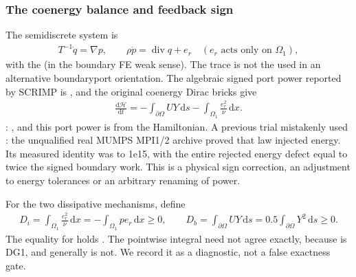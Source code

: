 \documentclass[letterpaper,10pt,english]{sphinxmanual}
\begin{document}
\subsubsection{The co\sphinxhyphen{}energy balance and feedback sign}
\label{\detokenize{examples/wave_coenergy:the-co-energy-balance-and-feedback-sign}}
\sphinxAtStartPar
The semidiscrete system is
\begin{equation*}
\begin{split}T^{-1}\dot q=\nabla p,\qquad
\rho\dot p=\operatorname{div}q+e_r
\quad (e_r\text{ acts only on }\Omega_1),\end{split}
\end{equation*}
\sphinxAtStartPar
with the 
 (in the boundary FE weak sense). The trace is
not the  used in an alternative boundary\sphinxhyphen{}port
orientation. The algebraic signed port power reported
by SCRIMP is , and the original
co\sphinxhyphen{}energy Dirac bricks give
\begin{equation*}
\begin{split}\frac{\mathrm d\mathcal H}{\mathrm dt}
=-\int_{\partial\Omega} UY\,\mathrm ds
 -\int_{\Omega_1}\frac{e_r^2}{\nu}\,\mathrm dx.\end{split}
\end{equation*}
\sphinxAtStartPar
{}:
, and this port power
is  from the Hamiltonian. A previous
trial mistakenly used : the unqualified
real MUMPS MPI1/2 archive
proved that law injected energy. Its measured identity
was  to 1e\sphinxhyphen{}15, with the entire rejected
energy defect equal to twice the signed boundary work.
This is a physical sign correction,  an adjustment
to energy tolerances or an arbitrary renaming of power.

\sphinxAtStartPar
For the two dissipative mechanisms, define
\begin{equation*}
\begin{split}D_i=\int_{\Omega_1}\frac{e_r^2}{\nu}\,\mathrm dx
   =-\int_{\Omega_1}p e_r\,\mathrm dx\ge0,
\qquad
D_b=\int_{\partial\Omega} UY\,\mathrm ds
   =0.5\int_{\partial\Omega}Y^2\,\mathrm ds\ge0.\end{split}
\end{equation*}
\sphinxAtStartPar
The equality for  holds . The pointwise integral 
need not agree exactly, because  is DG1, and
 generally is not. We record it as a diagnostic,
not a false exactness gate.
\end{document}
